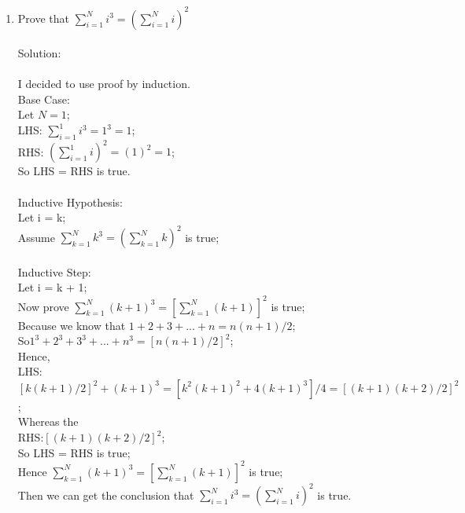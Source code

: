 \documentclass[12pt]{article}
\begin{document}
\begin{enumerate}
\item Prove that $\sum_{i = 1}^{N}i^3 = ( \sum_{i= 1}^{N} i )^2$
\\\\Solution:
\\\\I decided to use proof by induction.
\\Base Case:
\\Let $N = 1$;
\\LHS: $\sum_{i=1}^{1}i^3 = 1^3 = 1$;
\\RHS: $(\sum_{i=1}^{1}i)^2=(1)^2 = 1$;
\\So LHS = RHS is true.
\\\\Inductive Hypothesis:
\\Let i = k;
\\Assume  $\sum_{k = 1}^{N}k^3 = ( \sum_{k= 1}^{N} k )^2$ is true;
\\\\Inductive Step:
\\Let i = k + 1;
\\Now prove $\sum_{k = 1}^{N}(k+1)^3 = [ \sum_{k= 1}^{N} (k+1) ]^2$ is true;
\\Because we know that $1 + 2+3+...+n = n(n+1) /2$;
\\So$ 1^3 + 2^3 + 3^3 +...+n^3 = [n(n+1)/2]^2$;
\\Hence,
\\LHS: $[k(k+1)/2]^2 + (k+1)^3 = [k^2(k+1)^2+4(k+1)^3]/4 = [(k+1)(k+2)/2]^2$;
\\Whereas the
\\RHS:$ [(k+1)(k+2)/2]^2$;
\\So LHS = RHS is true;
\\Hence $\sum_{k = 1}^{N}(k+1)^3 = [ \sum_{k= 1}^{N} (k+1) ]^2$ is true;
\\Then we can get the conclusion that $\sum_{i = 1}^{N}i^3 = ( \sum_{i= 1}^{N} i )^2$ is true.
\\\\
\end{enumerate}
\end{document}
